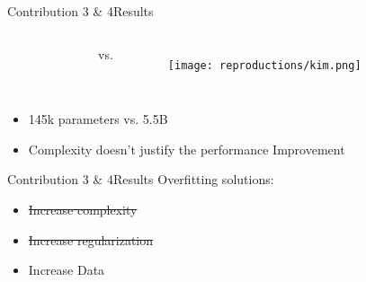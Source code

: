 \begin{frame}{Contribution 3 \& 4}{Results}
    \begin{columns}[c]
        \begin{figure}
            
        \end{figure}

        vs.

        \begin{figure}
            \texttt{[image: reproductions/kim.png]}
        \end{figure}
    \end{columns}

    \begin{table}[htbp]
        \centering
    \end{table}

    \begin{itemize}
        \item 145k parameters vs. 5.5B
        \item Complexity doesn't justify the performance Improvement
    \end{itemize}
\end{frame}

\begin{frame}{Contribution 3 \& 4}{Results}
    Overfitting solutions:
    \begin{itemize}
        \item \sout{Increase complexity}
        \item \sout{Increase regularization}
        \item Increase Data
    \end{itemize}
\end{frame}


